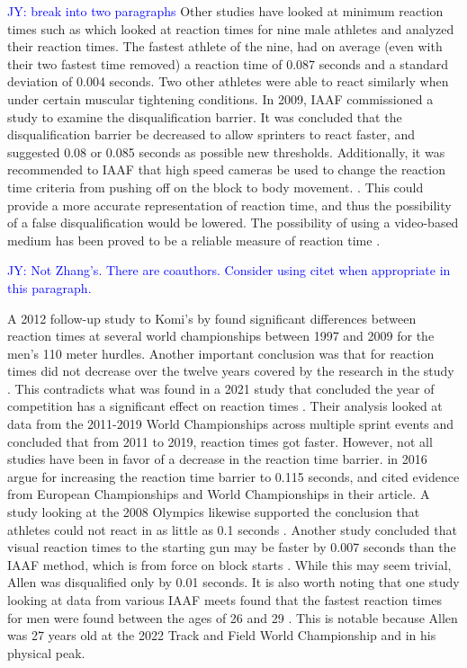 \documentclass[12pt, letterpaper, titlepage]{article}
\newcommand{\jy}[1]{\textcolor{blue}{JY: #1}}
\begin{document}
\jy{break into two paragraphs}
Other studies have looked at minimum reaction times such as \citet{pain2007sprint}  which looked at
reaction times for nine male athletes and analyzed their reaction times.  The
fastest athlete of the nine, had on average (even with their two fastest time 
removed) a reaction time of 0.087 seconds and a standard deviation of 0.004
seconds.  Two other athletes were able to react similarly when under certain
muscular tightening conditions.  In 2009, IAAF commissioned a study to examine
the disqualification barrier. It was concluded that the disqualification 
barrier be decreased to allow sprinters to
react faster, and suggested 0.08 or 0.085 seconds as possible new thresholds.
Additionally, it was recommended to IAAF that high speed cameras be used to
change the reaction time criteria from pushing off on the block to body movement.
\citep{komi2009iaaf}. This could provide a more accurate representation of 
reaction time, and thus the possibility of a false disqualification would be lowered.
The possibility of using a video-based medium has been proved to be a reliable
measure of reaction time \citep{mudric2015evaluation}.

\jy{Not Zhang's. There are coauthors. Consider using citet when appropriate in this paragraph.}

A 2012 follow-up study to Komi's by \citet*{pilianidis2012start} found
significant differences between reaction times at several world championships
between 1997 and 2009 for the men's 110 meter hurdles.  Another important
conclusion was that for reaction times did not decrease over the twelve years
covered by the research in the study \citep{pilianidis2012start}.  This contradicts
what was found in a 2021 study that concluded the year of competition has a
significant effect on reaction times \citep{zhang2021correlation}.  Their
analysis looked at data from the 2011-2019 World Championships across multiple
sprint events and concluded that from 2011 to 2019, reaction times got
faster. However, not  all studies have been in favor of a decrease in the
reaction time barrier. \citet*{brosnan2017effects} in 2016 argue for increasing 
the reaction time barrier to 0.115 seconds, and cited evidence from European 
Championships and World Championships in their article.  A study looking 
at the 2008 Olympics likewise supported the conclusion that athletes could not
react in as little as 0.1 seconds \citep{lipps2011implications}.  Another study
concluded that visual reaction times to the starting gun may be faster by 0.007
seconds than the IAAF method, which is from force on block starts 
\citep{holmes2018method}.  While this may seem trivial, Allen was disqualified
only by 0.01 seconds. It is also worth noting that one study looking at data 
from various IAAF meets found that the fastest reaction times for men were found
between the ages of 26 and 29 \citep{tonnessen2013reaction}.  This is notable 
because Allen was 27 years old at the 2022 Track and Field World Championship 
and in his physical peak.
\end{document}
